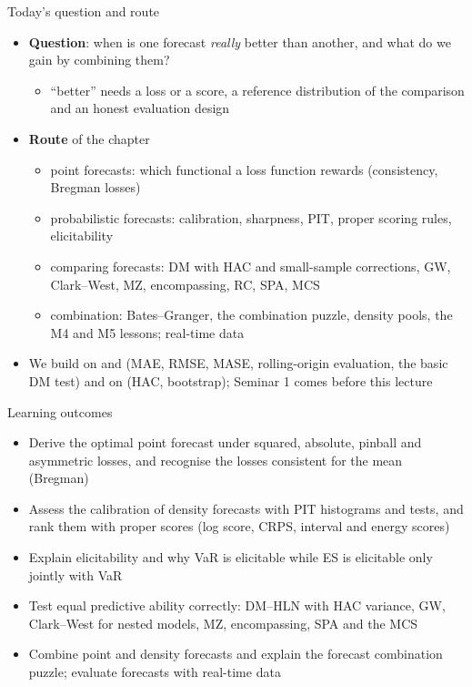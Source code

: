 \begin{frame}{Today's question and route}
\itemsize{\small}
\begin{itemize}
    \item \textbf{Question}: when is one forecast \emph{really} better than another, and what do we gain by combining them?
    \begin{itemize}
        \item ``better'' needs a loss or a score, a reference distribution of the comparison and an honest evaluation design
    \end{itemize}
    \item \textbf{Route} of the chapter
    \begin{itemize}
        \item point forecasts: which functional a loss function rewards (consistency, Bregman losses)
        \item probabilistic forecasts: calibration, sharpness, PIT, proper scoring rules, elicitability
        \item comparing forecasts: DM with HAC and small-sample corrections, GW, Clark--West, MZ, encompassing, RC, SPA, MCS
        \item combination: Bates--Granger, the combination puzzle, density pools, the M4 and M5 lessons; real-time data
    \end{itemize}
    \item We build on  and  (MAE, RMSE, MASE, rolling-origin evaluation, the basic DM test) and on  (HAC, bootstrap); Seminar 1 comes before this lecture
\end{itemize}
\end{frame}

\begin{frame}{Learning outcomes}
\itemsize{\small}
\begin{itemize}
    \item Derive the optimal point forecast under squared, absolute, pinball and asymmetric losses, and recognise the losses consistent for the mean (Bregman)
    \item Assess the calibration of density forecasts with PIT histograms and tests, and rank them with proper scores (log score, CRPS, interval and energy scores)
    \item Explain elicitability and why VaR is elicitable while ES is elicitable only jointly with VaR
    \item Test equal predictive ability correctly: DM--HLN with HAC variance, GW, Clark--West for nested models, MZ, encompassing, SPA and the MCS
    \item Combine point and density forecasts and explain the forecast combination puzzle; evaluate forecasts with real-time data
\end{itemize}
\end{frame}

